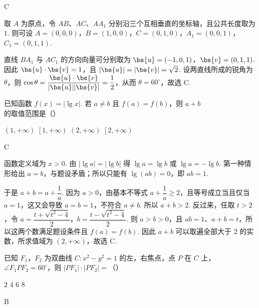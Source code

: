 \begin{answer}
C
\end{answer}

\begin{solution}
取 \(A\) 为原点，令 \(AB\)、\(AC\)、\(AA_1\) 分别沿三个互相垂直的坐标轴，且公共长度取为 \(1\). 则可设
\(A=(0,0,0)\)，\(B=(1,0,0)\)，\(C=(0,1,0)\)，\(A_1=(0,0,1)\)，\(C_1=(0,1,1)\).

直线 \(BA_1\) 与 \(AC_1\) 的方向向量可分别取为
\(\bs{u}=(-1,0,1)\)，\(\bs{v}=(0,1,1)\). 因此 \(\bs{u}\cdot\bs{v}=1\)，且 \(|\bs{u}|=|\bs{v}|=\sqrt{2}\).
设两直线所成的锐角为 \(\theta\)，则
\(\cos\theta=\dfrac{\bs{u}\cdot\bs{v}}{|\bs{u}||\bs{v}|}=\dfrac12\)，从而 \(\theta=60^{\circ}\)，故选 C.
\end{solution}

\begin{problem}
已知函数 \(f(x)=|\lg x|\). 若 \(a \neq b\) 且 \(f(a)=f(b)\)，则 \(a+b\) 的取值范围是（\quad）

\choices
    {\(\left(1,+\infty\right)\)}
    {\(\left[1,+\infty\right)\)}
    {\(\left(2,+\infty\right)\)}
    {\(\left[2,+\infty\right)\)}
\end{problem}

\begin{answer}
C
\end{answer}

\begin{solution}
函数定义域为 \(x>0\). 由 \(|\lg a|=|\lg b|\) 得
\(\lg a=\lg b\) 或 \(\lg a=-\lg b\).
第一种情形给出 \(a=b\)，与题设矛盾；所以只能有
\(\lg(ab)=0\)，即 \(ab=1\).

于是 \(a+b=a+\dfrac1a\). 因为 \(a>0\)，由基本不等式
\(a+\dfrac1a\geqslant2\)，且等号成立当且仅当 \(a=1\)，这又会导致 \(a=b=1\)，不符合 \(a\ne b\). 所以
\(a+b>2\). 反过来，任取 \(t>2\)，令
\(a=\dfrac{t+\sqrt{t^2-4}}{2}\)，\(b=\dfrac{t-\sqrt{t^2-4}}{2}\).
则 \(a>b>0\)，且 \(ab=1\)、\(a+b=t\)，所以这两个数满足题设条件且 \(f(a)=f(b)\). 因此 \(a+b\) 可以取遍全部大于 \(2\) 的实数，所求值域为 \((2,+\infty)\)，故选 C.
\end{solution}

\begin{problem}
已知 \(F_{1}\)，\(F_{2}\) 为双曲线 \(C: x^{2} - y^{2} = 1\) 的左，右焦点，点 \(P\) 在 \(C\) 上，\(\angle F_{1}PF_{2} = 60^{\circ}\)，则 \(|PF_{1}| \cdot |PF_{2}| =\)（\quad）

\choices
    {\(2\)}
    {\(4\)}
    {\(6\)}
    {\(8\)}
\end{problem}

\begin{answer}
B
\end{answer}

